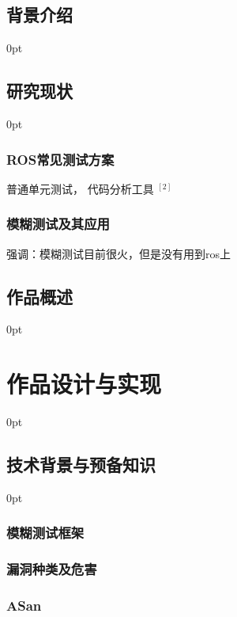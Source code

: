 \documentclass[zihao=-4]{ctexart}
\newcommand{\setParDis}{\setlength {\parskip} {0pt} }
\begin{document}
\begin{spacing}{1.5} %


\subsection{背景介绍}
\setParDis %


\subsection{研究现状}
\setParDis %
\subsubsection{ROS常见测试方案}

普通单元测试， 代码分析工具 $^{[2]}$

\subsubsection{模糊测试及其应用}
强调：模糊测试目前很火，但是没有用到ros上

\subsection{作品概述}
\setParDis %



\section{作品设计与实现}
\setParDis %

\subsection{技术背景与预备知识}
\setParDis %
\subsubsection{模糊测试框架}
\subsubsection{漏洞种类及危害}

\subsubsection{ASan}

\end{spacing}
\end{document}
